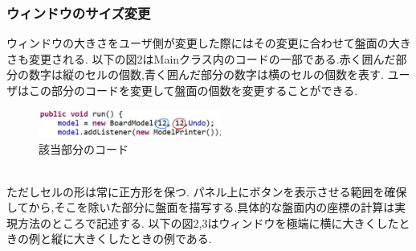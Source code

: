 \documentclass[dvipdfmx]{jarticle}
\begin{document}
\subsubsection{ウィンドウのサイズ変更}
ウィンドウの大きさをユーザ側が変更した際にはその変更に合わせて盤面の大きさも変更される.
以下の図2はMainクラス内のコードの一部である.赤く囲んだ部分の数字は縦のセルの個数,青く囲んだ部分の数字は横のセルの個数を表す.
ユーザはこの部分のコードを変更して盤面の個数を変更することができる.
\begin{figure}[h]
  \centering
  \includegraphics[width=6cm]{code_masu.png}
  \caption{該当部分のコード}
\end{figure}
\\ただしセルの形は常に正方形を保つ.
パネル上にボタンを表示させる範囲を確保してから,そこを除いた部分に盤面を描写する.具体的な盤面内の座標の計算は実現方法のところで記述する.
以下の図2,3はウィンドウを極端に横に大きくしたときの例と縦に大きくしたときの例である.
\end{document}
